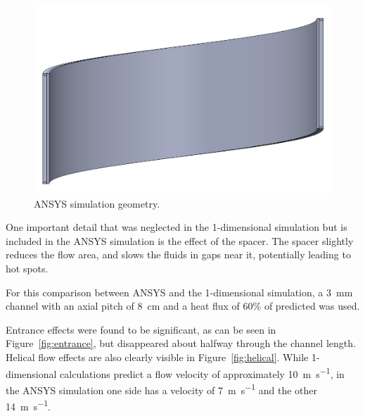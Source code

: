 \documentclass[11pt]{article}
\begin{document}
\begin{figure}[H]
	\centering
  	\includegraphics[width=0.6\linewidth]{solidwork_screenshot}
  	\caption{ANSYS simulation geometry.}
  	\label{fig:ansys_geom}
\end{figure}

One important detail that was neglected in the 1-dimensional simulation but is included in the ANSYS simulation is the effect of the spacer. The spacer slightly reduces the flow area, and slows the fluids in gaps near it, potentially leading to hot spots.

For this comparison between ANSYS and the 1-dimensional simulation, a \SI{3}{\milli\meter} channel with an axial pitch of \SI{8}{\centi\meter} and a heat flux of 60\% of predicted was used.

Entrance effects were found to be significant, as can be seen in Figure~\ref{fig:entrance}, but disappeared about halfway through the channel length. Helical flow effects are also clearly visible in Figure~\ref{fig:helical}. While 1-dimensional calculations predict a flow velocity of approximately \SI{10}{\meter\per\second}, in the ANSYS simulation one side has a velocity of \SI{7}{\meter\per\second} and the other \SI{14}{\meter\per\second}.
\end{document}
